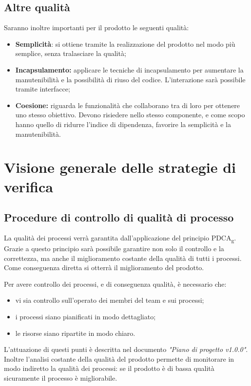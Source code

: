 \documentclass[12pt,a4paper,titlepage]{article}
\begin{document}
		\subsection{Altre qualità}
		Saranno inoltre importanti per il prodotto le seguenti qualità:
		\begin{itemize}
			\item \textbf{Semplicità}: si ottiene tramite la realizzazione del prodotto nel modo più semplice, senza tralasciare la qualità;
			\item \textbf{Incapsulamento:} applicare le tecniche di incapsulamento per aumentare la manutenibilità e la possibilità di riuso del codice. L'interazione sarà possibile tramite interfacce;
			\item \textbf{Coesione:} riguarda le funzionalità che collaborano tra di loro per ottenere uno stesso obiettivo. Devono risiedere nello stesso componente, e come scopo hanno quello di ridurre l'indice di dipendenza, favorire la semplicità e la manutenibilità.
		\end{itemize}
	\section{Visione generale delle strategie di verifica}
	\subsection{Procedure di controllo di qualità di processo}
	La qualità dei processi verrà garantita dall'applicazione del principio PDCA\textsubscript{g}. Grazie a questo principio sarà possibile garantire non solo il controllo e la correttezza, ma anche il miglioramento costante della qualità di tutti i processi. Come conseguenza diretta si otterrà il miglioramento del prodotto.
	
	Per avere controllo dei processi, e di conseguenza qualità, è necessario che:
	\begin{itemize}
		\item vi sia controllo sull'operato dei membri del team e sui processi;
		\item i processi siano pianificati in modo dettagliato;
		\item le risorse siano ripartite in modo chiaro.
	\end{itemize}
	L'attuazione di questi punti è descritta nel documento \textit{"Piano di progetto v1.0.0"}. Inoltre l'analisi costante della qualità del prodotto permette di monitorare in modo indiretto la qualità dei processi: se il prodotto è di bassa qualità sicuramente il processo è migliorabile.
	
\end{document}
